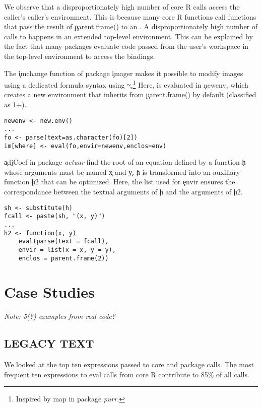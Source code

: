\documentclass[USenglish,cleveref, autoref, thm-restate]{lipics-v2019}
\newcommand{\NOTE}[1]{{\it Note: #1}\xspace}
\begin{document}
We observe that a disproportionately high number of core R \eval calls
access the caller's caller's environment. This is because many core R
functions call functions that pass the result of \c{parent.frame()} to
an \eval. A disproportionately high number of calls to \eval happens
in an extended top-level environment. This can be explained by the
fact that many packages evaluate code passed from the user's workspace
in the top-level environment to access the bindings.


The \c{imchange} function of package \c{imager} makes it possible to
modify images using a dedicated formula syntax using
\c{\~}.\footnote{Inspired by {map} in package \emph{purr}.} Here,
\eval is evaluated in \c{newenv}, which creates a new environment that
inherits from \c{parent.frame()} by default (classified as 1+).


\begin{lstlisting}
newenv <- new.env()
...
fo <- parse(text=as.character(fo)[2])
im[where] <- eval(fo,envir=newenv,enclos=env)
\end{lstlisting}

\c{adjCoef} in package \emph{actuar} find the root of an equation
defined by a function \c{h} whose arguments must be named \c{x} and
\c{y}. \c{h} is transformed into an auxiliary function \c{h2} that can
be optimized. Here, the list used for \c{envir} ensures the
correspondance between the textual arguments of \c{h} and the
arguments of \c{h2}.


\begin{lstlisting}
sh <- substitute(h)
fcall <- paste(sh, "(x, y)")
...
h2 <- function(x, y)
    eval(parse(text = fcall),
    envir = list(x = x, y = y),
    enclos = parent.frame(2))
\end{lstlisting}


\section{Case Studies}

\NOTE{5(?) examples from real code?}

\subsection{LEGACY TEXT}

We looked at the top ten expressions passed to core and package \eval
calls. The most frequent ten expressions to eval calls from core R
contribute to 85\% of all \eval calls.
\end{document}
